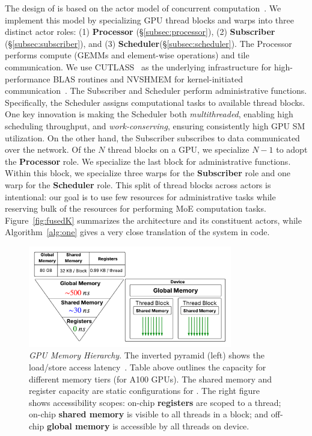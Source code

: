 The design of \sysname is based on the actor model of concurrent computation~\cite{agha:85, 10.5555/1624775.1624804, Greif:75}. We implement this model by specializing GPU thread blocks and warps into three distinct actor roles: (1) \textbf{Processor} (\S\ref{subsec:processor}), (2) \textbf{Subscriber} (\S\ref{subsec:subscriber}), and (3) \textbf{Scheduler}(\S\ref{subsec:scheduler}).
The Processor performs compute (GEMMs and element-wise operations) and tile communication. We use CUTLASS~\cite{Thakkar_CUTLASS_2023} as the underlying infrastructure for high-performance BLAS routines and NVSHMEM for kernel-initiated communication~\cite{nvshm}. The Subscriber and Scheduler perform administrative functions. Specifically, the Scheduler assigns computational tasks to available thread blocks. One key innovation is making the Scheduler both \emph{multithreaded}, enabling high scheduling throughput, and \emph{work-conserving}, ensuring consistently high GPU SM utilization. On the other hand, the Subscriber subscribes to data communicated over the network. Of the $N$ thread blocks on a GPU, we specialize $N-1$ to adopt the \textbf{Processor} role. We specialize the last block for administrative functions. Within this block, we specialize three warps for the \textbf{Subscriber} role and one warp for the \textbf{Scheduler} role. This split of thread blocks across actors is intentional: our goal is to use few resources for administrative tasks while reserving bulk of the resources for performing MoE computation tasks. Figure~\ref{fig:fusedK} summarizes the \sysname architecture and its constituent actors, while Algorithm~\ref{alg:one} gives a very close translation of the system in code.

\begin{figure}[!ht]
    \centering
    \includegraphics[width=3.5in]{figures/mem}
    \caption{\emph{GPU Memory Hierarchy}.
    The inverted pyramid (left) shows the load/store access latency~\cite{10579250, amperearch, ptx}. Table above outlines the capacity for different memory tiers (for A100 GPUs). The shared memory and register capacity are static configurations for \sysname.
    The right figure shows accessibility scopes: on-chip \textbf{registers}
    are scoped to a thread; on-chip \textbf{shared memory} is visible to all threads in a block;
    and off-chip \textbf{global memory} is accessible by all threads on device.}
    \label{fig:mem}
    \vspace{-3mm}
\end{figure}

